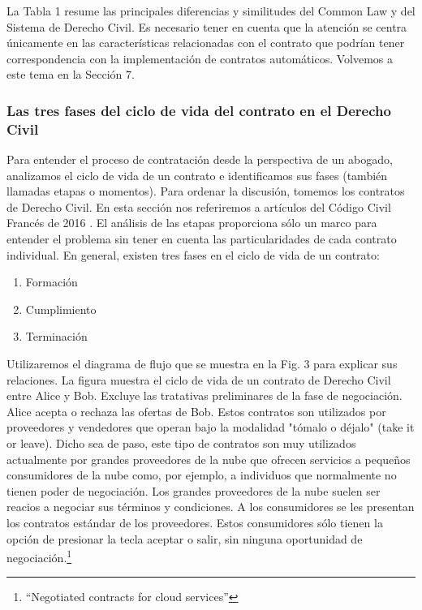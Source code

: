 \documentclass[12pt]{report} %
\begin{document}
\begin{itemize}
\begin{itemize}
\end{itemize}

La Tabla 1 resume las principales diferencias y similitudes del Common Law y del Sistema de Derecho Civil. Es necesario tener en cuenta que la atención se centra únicamente en las características relacionadas con el contrato que podrían tener correspondencia con la implementación de contratos automáticos. Volvemos a este tema en la Sección 7.

\subsubsection{Las tres fases del ciclo de vida del contrato en el Derecho Civil}


Para entender el proceso de contratación desde la perspectiva de un abogado, analizamos el ciclo de vida de un contrato e identificamos sus fases (también llamadas etapas o momentos). Para ordenar la discusión, tomemos los contratos de Derecho Civil. En esta sección nos referiremos a artículos del Código Civil Francés de 2016 . El análisis de las etapas proporciona sólo un marco para entender el problema sin tener en cuenta las particularidades de cada contrato individual. En general, existen tres fases en el ciclo de vida de un contrato:


\begin{enumerate}
    \item Formación 
    \item Cumplimiento
    \item Terminación   
\end{enumerate}

Utilizaremos el diagrama de flujo que se muestra en la Fig. 3 para explicar sus relaciones. La figura muestra el ciclo de vida de un contrato de Derecho Civil entre Alice y Bob. Excluye las tratativas preliminares de la fase de negociación. Alice acepta o rechaza las ofertas de Bob. Estos contratos son utilizados por proveedores y vendedores que operan bajo la modalidad "tómalo o déjalo" (take it or leave). Dicho sea de paso, este tipo de contratos son muy utilizados actualmente por grandes proveedores de la nube que ofrecen servicios a pequeños consumidores de la nube como, por ejemplo, a individuos que normalmente no tienen poder de negociación. Los grandes proveedores de la nube suelen ser reacios a negociar sus términos y condiciones. A los consumidores se les presentan los contratos estándar de los proveedores. Estos consumidores sólo tienen la opción de presionar la tecla aceptar o salir, sin ninguna oportunidad de negociación.\footnote{\cite{WKuan2013}“Negotiated contracts for cloud services” } 


\end{itemize}
\end{document}
